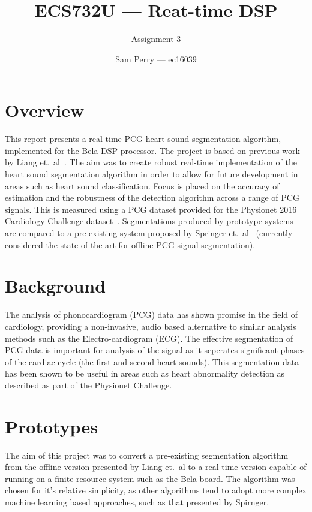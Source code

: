 \documentclass[titlepage]{scrartcl}
\begin{document}
\title{ECS732U --- Reat-time DSP}
\subtitle{\LARGE{Assignment 3}}
\author{Sam Perry --- ec16039}

\maketitle

\section{Overview}
This report presents a real-time PCG heart sound segmentation algorithm,
implemented for the Bela DSP processor. The project is based on previous work
by Liang et.\ al~\citeyearpar{Liang1997}. The aim was to create robust
real-time implementation of the heart sound segmentation algorithm in order to
allow for future development in areas such as heart sound classification.
Focus is placed on the accuracy of estimation and the robustness of the
detection algorithm across a range of PCG signals. This is measured using a PCG
dataset provided for the Physionet 2016 Cardiology Challenge
dataset~\parencite{Physionet2016}.  Segmentations produced by prototype systems
are compared to a pre-existing system proposed by Springer et.\
al~\citeyearpar{Springer2016} (currently considered the state of the art for
offline PCG signal segmentation).

\section{Background}
The analysis of phonocardiogram (PCG) data has shown promise in the field of
cardiology, providing a non-invasive, audio based alternative to similar
analysis methods such as the Electro-cardiogram (ECG). The effective
segmentation of PCG data is important for analysis of the signal as it
seperates significant phases of the cardiac cycle (the first and second heart
sounds). This segmentation data has been shown to be useful in areas such as
heart abnormality detection as described as part of the Physionet Challenge.

\section{Prototypes}
The aim of this project was to convert a pre-existing segmentation algorithm
from the offline version presented by Liang et.\ al to a real-time version
capable of running on a finite resource system such as the Bela board. The
algorithm was chosen for it's relative simplicity, as other algorithms tend to
adopt more complex machine learning based approaches, such as that presented by
Spirnger.\\
\end{document}
